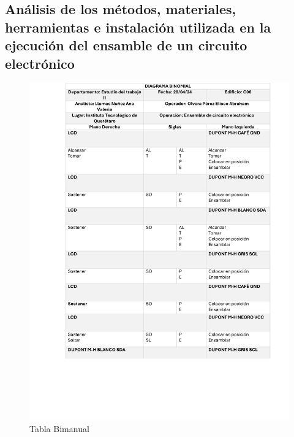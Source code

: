 \subsection{Análisis de los métodos, materiales, herramientas e instalación utilizada en la ejecución del ensamble de un circuito electrónico}
%
%
\begin{figure}[H]
        \centering
        \includegraphics[trim = {5mm 80mm 5mm 10mm},clip,scale=0.40]{16/Img/tablaBimanual.pdf}
        \caption{Tabla Bimanual}
        \label{Tabla Bimanual}
    \end{figure}
%
%
